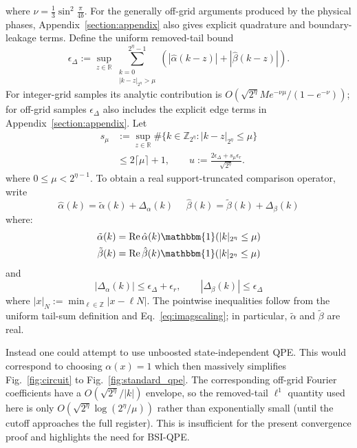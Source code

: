 \documentclass[aps,floatfix,10pt,amssymb,amsfont,amsmath,superscriptaddress,float,nofootinbib,longbibliography,nobalancelastpage,twocolumn]{revtex4-2}
\begin{document}
where $\nu = \frac{1}{3}\sin^2\frac{\pi}{4b}$. For the generally off-grid arguments produced by the physical phases, Appendix~\ref{section:appendix} also gives explicit quadrature and boundary-leakage terms. Define the uniform removed-tail bound
\begin{equation}
    \epsilon_\Delta:=\sup_{z\in\mathbb{R}}\sum_{\substack{k=0\\|k-z|_{2^\eta}>\mu}}^{2^\eta-1}
    \left(|\hat\alpha(k-z)|+|\hat\beta(k-z)|\right).
\end{equation}
For integer-grid samples its analytic contribution is
$O(\sqrt{2^\eta}M e^{-\nu\mu}/(1-e^{-\nu}))$; for off-grid samples $\epsilon_\Delta$
also includes the explicit edge terms in Appendix~\ref{section:appendix}.
Let
\begin{equation*}
\begin{aligned}
 s_\mu&:=\sup_{z\in\mathbb R}\#
 \{k\in\mathbb Z_{2^\eta}:|k-z|_{2^\eta}\leq\mu\}\\
 &\leq2\lceil\mu\rceil+1,
 \qquad
 u:=\frac{2\epsilon_\Delta+s_\mu\epsilon_r}{\sqrt{2^\eta}}.
\end{aligned}
\end{equation*}
where $0\leq\mu<2^{\eta-1}$. To obtain a real support-truncated comparison operator, write
\begin{equation}
    \hat\alpha(k) = \tilde\alpha(k) + \Delta_{\alpha}(k) \>\>\>\>\>\>\hat\beta(k) = \tilde\beta(k) + \Delta_{\beta}(k)
    \label{eq:decomposealpha}
\end{equation}
where:
\begin{align}
    \tilde\alpha(k) &= \operatorname{Re}\hat\alpha(k)\mathbbm{1}(|k|_{2^{\eta}}\leq \mu)\\
    \tilde\beta(k) &= \operatorname{Re}\hat\beta(k)\mathbbm{1}(|k|_{2^{\eta}}\leq \mu)
    \label{eq:decomposealpha2}
\end{align}  and 
\begin{equation}
    |\Delta_\alpha(k)|\leq \epsilon_{\Delta}+\epsilon_r,
    \qquad |\Delta_\beta(k)|\leq \epsilon_{\Delta}
    \label{eq:decomposealpha3}
\end{equation}
where $|x|_N:=\min_{\ell\in\mathbb{Z}}|x-\ell N|$. The pointwise inequalities follow from the uniform tail-sum definition and Eq.~\eqref{eq:imagscaling}; in particular, $\tilde\alpha$ and $\tilde\beta$ are real.


Instead one could attempt to use unboosted state-independent QPE. This would correspond to choosing $\alpha(x)=1$ which then massively simplifies Fig.~\ref{fig:circuit} to Fig.~\ref{fig:standard_qpe}. The corresponding off-grid Fourier coefficients have a $O(\sqrt{2^\eta}/|k|)$ envelope, so the removed-tail $\ell^1$ quantity used here is only
$O(\sqrt{2^\eta}\log(2^\eta/\mu))$ rather than exponentially small (until
the cutoff approaches the full register).  This is insufficient for the
present convergence proof and highlights the need for BSI-QPE.
\end{document}
